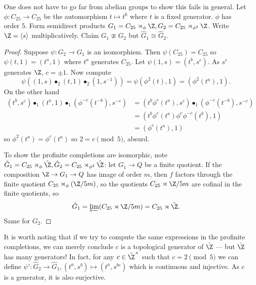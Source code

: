 \documentclass[a4paper]{article}
\begin{document}
\begin{eg}[Baumslag]
  One does not have to go far from abelian groups to show this fails in general. Let \(\phi: C_{25} \to C_{25}\) be the automorphism \(t \mapsto t^6\) where \(t\) is a fixed generator. \(\phi\) has order \(5\). Form semidirect products \(G_1 = C_{25} \rtimes_\phi \Z, G_2 = C_{25} \rtimes_{\phi^2} \Z\). Write \(\Z = \langle s\rangle\) multiplicatively. Claim \(G_1 \ncong G_2\) but \(\hat G_1 \cong \hat G_2\).

  \begin{proof}
    Suppose \(\psi: G_2 \to G_1\) is an isomorphism. Then \(\psi(C_{25}) = C_{25}\) so \(\psi(t, 1) = (t^a, 1)\) where \(t^a\) generates \(C_{25}\). Let \(\psi(1, s) = (t^b, s^c)\). As \(s^c\) generates \(\Z\), \(c = \pm 1\). Now compute
    \[
      \psi((1, s) \bullet_2 (t, 1) \bullet_2 (1, s^{-1}))
      = \psi(\phi^2(t), 1)
      = (\phi^2(t^a), 1).
    \]
    On the other hand
    \begin{align*}
      (t^b, s^c) \bullet_1 (t^a, 1) \bullet_1 (\phi^{-c}(t^{-b}), s^{-c})
      &= (t^b \phi^c(t^a), s^c) \bullet_1 (\phi^{-c} (t^{-b}), s^{-c}) \\
      &= (t^b \phi^c(t^a) \phi^c \phi^{-c}(t^b), 1) \\
      &= (\phi^c(t^a), 1)
    \end{align*}
    so \(\phi^2(t^a) = \phi^c(t^a)\) so \(2 = c \pmod 5\), absurd.

    To show the profinite completions are isomorphic, note \(\hat G_1 = C_{25} \rtimes_\phi \hat \Z, \hat G_2 = C_{25} \rtimes_{\phi^2} \hat \Z\): let \(G_1 \to Q\) be a finite quotient. If the composition \(\Z \to G_1 \to Q\) has image of order \(m\), then \(f\) factors through the finite quotient \(C_{25} \rtimes_\phi (\Z/5m)\), so the quotients \(C_{25} \rtimes \Z/5m\) are cofinal in the finite quotients, so
    \[
      \hat G_1 = \varprojlim (C_{25} \rtimes \Z/5m) = C_{25} \rtimes \hat \Z.
    \]
    Same for \(G_2\).
  \end{proof}

  It is worth noting that if we try to compute the same expressions in the profinite completions, we can merely conclude \(c\) is a topological generator of \(\hat \Z\) --- but \(\hat \Z\) has many generators! In fact, for any \(c \in \hat \Z^\times\) such that \(c = 2 \pmod 5\) we can define \(\psi': \hat G_2 \to \hat G_1, (t^a, s^b) \mapsto (t^a, s^{bc})\) which is continuous and injective. As \(c\) is a generator, it is also surjective.
\end{eg}
\end{document}
